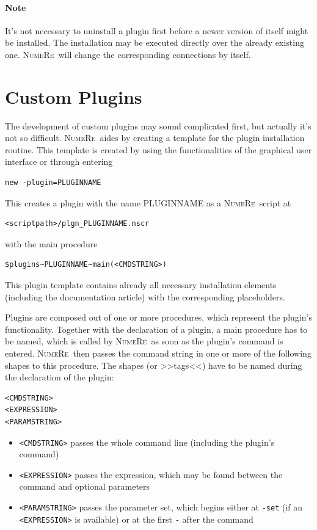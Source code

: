 \documentclass[DIV=14,headsepline,footsepline]{scrbook}
\newcommand{\NR}{\textsc{Nu\-me\-Re}}
\begin{document}
				\paragraph{Note}
					It's not necessary to uninstall a plugin first before a newer version of itself might be installed. The installation may be executed directly over the already existing one. \NR\ will change the corresponding connections by itself.
			\section{Custom Plugins}
				The development of custom plugins may sound complicated first, but actually it's not so difficult. \NR\ aides by creating a template for the plugin installation routine. This template is created by using the functionalities of the graphical user interface or through entering
				\begin{lstlisting}
new -plugin=PLUGINNAME
				\end{lstlisting}
				This creates a plugin with the name PLUGINNAME as a \NR\ script at
				\begin{lstlisting}
<scriptpath>/plgn_PLUGINNAME.nscr
				\end{lstlisting}
				with the main procedure
				\begin{lstlisting}
$plugins~PLUGINNAME~main(<CMDSTRING>)
				\end{lstlisting}
				This plugin template contains already all necessary installation elements (including the documentation article) with the corresponding placeholders.
				
				Plugins are composed out of one or more procedures, which represent the plugin's functionality. Together with the declaration of a plugin, a main procedure has to be named, which is called by \NR\ as soon as the plugin's command is entered. \NR\ then passes the command string in one or more of the following shapes to this procedure. The shapes (or >>tags<<) have to be named during the declaration of the plugin:
				\begin{lstlisting}
<CMDSTRING>
<EXPRESSION>
<PARAMSTRING>
				\end{lstlisting}
				\begin{itemize}
					\item \verb+<CMDSTRING>+ passes the whole command line (including the plugin's command)
					\item \verb+<EXPRESSION>+ passes the expression, which may be found between the command and optional parameters
					\item \verb+<PARAMSTRING>+ passes the parameter set, which begins either at \verb+-set+ (if an \verb+<EXPRESSION>+ is available) or at the first \verb+-+ after the command
				\end{itemize}
				
\end{document}
